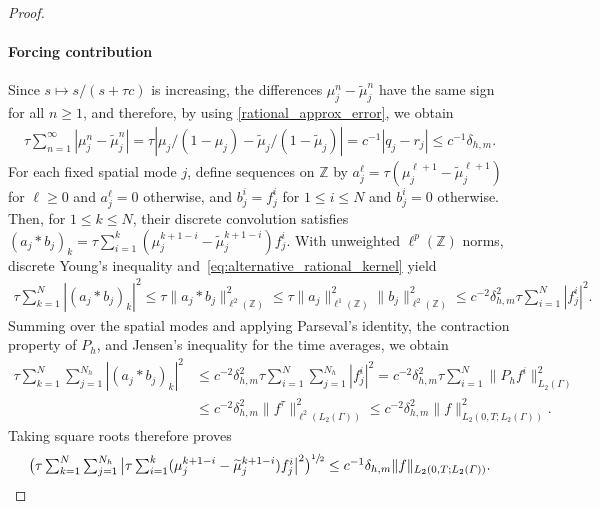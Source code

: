 \documentclass[numbers,webpdf]{ima-authoring-template}%
\theoremstyle{thmstyletwo}%
\numberwithin{equation}{section}
\begin{document}
\begin{proof}
    \paragraph{Forcing contribution}
    Since $s\mapsto s/(s+\tau c)$ is increasing, the differences $ \mu_j^n-\widetilde \mu_j^n$ have the same sign for all $n\geq1$, and therefore, by using \eqref{rational_approx_error}, we obtain
    \begin{align}
    \label{eq:alternative_rational_kernel}
    \textstyle
        \tau\sum_{n=1}^\infty | \mu_j^n-\widetilde \mu_j^n| =\tau\left|  \mu_j/(1- \mu_j) -\widetilde \mu_j/(1-\widetilde \mu_j) \right| =c^{-1}|q_j-r_j| \leq c^{-1}\delta_{h,m}.
    \end{align}
    For each fixed spatial mode $j$, define sequences on $\mathbb{Z}$ by $a_j^\ell =\tau( \mu_j^{\ell+1}-\widetilde \mu_j^{\ell+1})$ for $\ell\geq0$ and $a_j^\ell=0$ otherwise, and $b_j^i = f_j^i$ for $1\leq i\leq N$ and $b_j^i=0$ otherwise. Then, for $1\leq k\leq N$, their discrete convolution satisfies $(a_j*b_j)_k=\tau\sum_{i=1}^k( \mu_j^{k+1-i}-\widetilde \mu_j^{k+1-i})f_j^i$. With unweighted $\ell^p(\mathbb{Z})$ norms, discrete Young's inequality and~\eqref{eq:alternative_rational_kernel} yield
    \begin{align*}
    \textstyle
        \tau\sum_{k=1}^N \left|(a_j*b_j)_k \right|^2 \leq \tau\|a_j*b_j\|_{\ell^2(\mathbb{Z})}^2 \leq \tau\|a_j\|_{\ell^1(\mathbb{Z})}^2 \|b_j\|_{\ell^2(\mathbb{Z})}^2 \leq c^{-2}\delta_{h,m}^2 \tau\sum_{i=1}^N|f_j^i|^2.
    \end{align*}
    Summing over the spatial modes and applying Parseval's identity, the contraction property of $P_h$, and Jensen's inequality for the time averages, we obtain
    \begin{align*}
    \textstyle
        \tau\sum_{k=1}^N\sum_{j=1}^{N_h}  \left|(a_j*b_j)_k\right|^2 &\leq \textstyle c^{-2}\delta_{h,m}^2 \tau\sum_{i=1}^N\sum_{j=1}^{N_h} |f_j^i|^2 = c^{-2}\delta_{h,m}^2 \tau\sum_{i=1}^N \|P_hf^i\|_{L_2(\Gamma)}^2\\
        &\leq  c^{-2}\delta_{h,m}^2 \|f^\tau\|_{\ell^2(L_2(\Gamma))}^2 \leq c^{-2}\delta_{h,m}^2 \|f\|^2_{L_2(0,T;L_2(\Gamma))}.
    \end{align*}
    Taking square roots therefore proves
    \begin{align}
    \label{eq:alternative_rational_forcing}
    \textstyle
        \big(\tau\sum_{k=1}^N\sum_{j=1}^{N_h} \big|\tau\sum_{i=1}^k ( \mu_j^{k+1-i}-\widetilde \mu_j^{k+1-i})f_j^i \big|^2\big)^{\sfrac12} \leq c^{-1}\delta_{h,m} \|f\|_{L_2(0,T;L_2({\mit\varGamma}))}.
    \end{align}

\end{proof}
\end{document}
